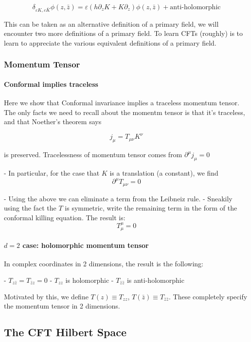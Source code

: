 $$\delta_{\varepsilon K, \varepsilon \bar K} \phi(z, \bar z)= \varepsilon (h \partial_z K + K \partial_z) \phi(z, \bar z) + \text{anti-holomorphic} $$

This can be taken as an alternative definition of a primary field, we will encounter two more definitions of a primary field. To learn CFTs (roughly) is to learn to appreciate the various equivalent definitions of a primary field.

\subsubsection{ Momentum Tensor}

\paragraph{ Conformal implies traceless}
Here we show that Conformal invariance implies a traceless momentum tensor. The only facts we need to recall about the momentm tensor is that it's traceless, and that  Noether's theorem says

$$j_\mu = T_{\mu\nu} K^\nu$$ 

is preserved. Tracelessness of momentum tensor comes from $\partial^\mu j_\mu = 0$

- In particular, for the case that $K$ is a translation (a constant), we find
$$\partial^\mu T_{\mu\nu} = 0$$

- Using the above we can eliminate a term from the Leibneiz rule.
- Sneakily using the fact the $T$ is symmetric, write the remaining term in the form of the conformal killing equation. The result is:
$$T^\mu_\mu = 0$$


\paragraph{ $d = 2$ case: holomorphic momentum tensor}

In complex coordinates in 2 dimensions, the result is the following:

- $T_{z \bar z} = T_{\bar z z} = 0$
- $T_{zz}$ is holomorphic
- $T_{\bar z \bar z}$ is anti-holomorphic

Motivated by this, we define $T(z) \equiv T_{zz}$, $T(\bar z) \equiv T_{\bar z \bar z}$. These completely specify the momentum tensor in 2 dimensions.

\subsection{ The CFT Hilbert Space}

